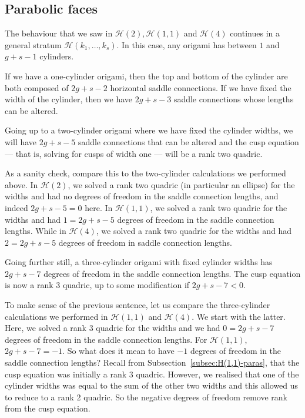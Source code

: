 \documentclass[a4paper,11pt]{amsart}
\numberwithin{equation}{section}
\numberwithin{figure}{section}
\numberwithin{table}{section}
\newcommand{\calH}{\mathcal{H}}
\begin{document}
\subsection{Parabolic faces}

The behaviour that we saw in $\calH(2), \calH(1,1)$ and $\calH(4)$ continues in a general stratum $\calH(k_1,\ldots,k_s)$. In this case, any origami has between $1$ and $g+s-1$ cylinders.

If we have a one-cylinder origami, then the top and bottom of the cylinder are both composed of $2g+s-2$ horizontal saddle connections. If we have fixed the width of the cylinder, then we have $2g+s-3$ saddle connections whose lengths can be altered.

Going up to a two-cylinder origami where we have fixed the cylinder widths, we will have $2g+s-5$ saddle connections that can be altered and the cusp equation --- that is, solving for cusps of width one --- will be a rank two quadric.

As a sanity check, compare this to the two-cylinder calculations we performed above. In $\calH(2)$, we solved a rank two quadric (in particular an ellipse) for the widths and had no degrees of freedom in the saddle connection lengths, and indeed $2g+s-5 = 0$ here. In $\calH(1,1)$, we solved a rank two quadric for the widths and had $1 = 2g+s-5$ degrees of freedom in the saddle connection lengths. While in $\calH(4)$, we solved a rank two quadric for the widths and had $2 = 2g+s-5$ degrees of freedom in saddle connection lengths.

Going further still, a three-cylinder origami with fixed cylinder widths has $2g+s-7$ degrees of freedom in the saddle connection lengths. The cusp equation is now a rank 3 quadric, up to some modification if $2g+s-7 < 0$.

To make sense of the previous sentence, let us compare the three-cylinder calculations we performed in $\calH(1,1)$ and $\calH(4)$. We start with the latter. Here, we solved a rank 3 quadric for the widths and we had $0 = 2g+s-7$ degrees of freedom in the saddle connection lengths. For $\calH(1,1)$, $2g+s-7 = -1$. So what does it mean to have $-1$ degrees of freedom in the saddle connection lengths? Recall from Subsection~\ref{subsec:H(1,1)-paras}, that the cusp equation was initially a rank 3 quadric. However, we realised that one of the cylinder widths was equal to the sum of the other two widths and this allowed us to reduce to a rank 2 quadric. So the negative degrees of freedom remove rank from the cusp equation.
\end{document}
